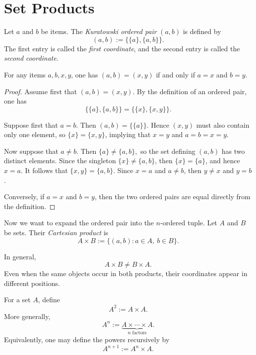 \section{Set Products}
\label{sec:ordered-pairs-products-relations}


Let $a$ and $b$ be items. The \textit{Kuratowski ordered pair} $(a,b)$ is defined by
\[
  (a,b):=\{\{a\},\{a,b\}\}.
\]
The first entry is called the \emph{first coordinate}, and the second
entry is called the \emph{second coordinate}.



\begin{proposition}
For any items \(a,b,x,y\), one has 
$
  (a,b)=(x,y)
$
if and only if
$a = x$ and $b = y$.
\end{proposition}

\begin{proof}
Assume first that $(a,b)=(x,y)$.
By the definition of an ordered pair, one has
\[
  \bigl\{\{a\},\{a,b\}\bigr\}
  =
  \bigl\{\{x\},\{x,y\}\bigr\}.
\]

Suppose first that $a=b$. Then
$
  (a,b)=\{\{a\}\}.
$ Hence $(x,y)$ must also contain only one
element, so $\{x\} = \{x,y\}$, implying that $x = y$ and $a = b = x = y$.

Now suppose that \(a\neq b\). Then
$
  \{a\}\neq\{a,b\},
$
so the set defining $(a,b)$ has two distinct elements. Since the singleton
$\{x\} \neq \{a,b\}$, then $\{x\}=\{a\}$,
and hence \(x=a\). It follows that
$
  \{x,y\}=\{a,b\}.
$
Since $x=a$ and $a \neq b$, then $y \neq x$ and $y = b$.

Conversely, if \(a=x\) and \(b=y\), then the two ordered pairs are equal
directly from the definition.
\end{proof}
Now we want to expand the ordered pair into the $n$-ordered tuple. Let $A$ and $B$ be sets. Their \textit{Cartesian product} is
\[
  A\times B
  :=
  \{(a,b):a\in A,\ b\in B\}.
\]
\begin{remark}
In general,
\[
  A\times B\neq B\times A.
\]
Even when the same objects occur in both products, their coordinates
appear in different positions.
\end{remark}

\begin{definition}
For a set \(A\), define
\[
  A^2:=A\times A.
\]
More generally,
\[
  A^n
  :=
  \underbrace{A\times\cdots\times A}_{n\text{ factors}}.
\]
Equivalently, one may define the powers recursively by
\[
  A^{n+1}:=A^n\times A.
\]
\end{definition}

